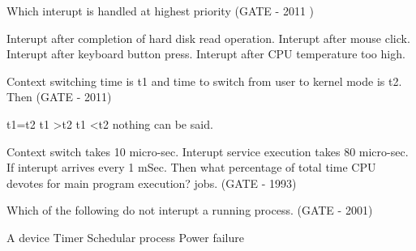 
\begin{minipage}{\linewidth}

  \question Which interupt is handled at highest priority (GATE - 2011 )

  \begin{choices}
    \choice Interupt after completion of hard disk read operation.
    \choice Interupt after mouse click.
    \choice Interupt after keyboard button press.
    \choice Interupt after CPU temperature too high.
  \end{choices}

\end{minipage}



\begin{minipage}{\linewidth}

  \question Context switching time is t1 and time to switch from user to kernel mode is t2. Then (GATE - 2011)

  \begin{oneparchoices}
    \choice t1=t2
    \choice t1 \textgreater  t2
    \choice t1 \textless  t2
    \choice nothing can be said.
  \end{oneparchoices}


\end{minipage}


\begin{minipage}{\linewidth}

  \question Context switch takes 10 micro-sec. Interupt service execution takes  80 micro-sec. If interupt arrives every 1 mSec.
            Then what percentage of total time CPU devotes for main program execution?  jobs. (GATE - 1993)

\end{minipage}


\begin{minipage}{\linewidth}

  \question  Which of the following do not interupt a running process. (GATE - 2001)

  \begin{choices}
    \choice A device
    \choice Timer
    \choice Schedular process
    \choice Power failure
  \end{choices}

\end{minipage}

